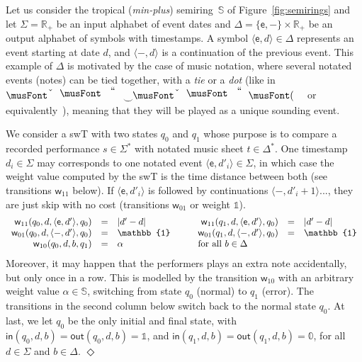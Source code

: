 \documentclass[runningheads]{llncs}
\def\endex{\hspace*{\fill} $\Diamond$\smallskip }
{\theorembodyfont{\rmfamily} \theoremstyle{break} \newtheorem{algo}{Algorithm}}
\def\<#1>{\langle #1 \rangle}
\newcommand{\R}{\mathcal{R}}
\newcommand{\Semiring}{\mathbb{S}}
\newcommand{\zero}{\mathbb{0}}
\newcommand{\one}{\mathbb{1}}
\def\SWT{\textsf{swT}\xspace}
\def\wei{\mathsf{w}}
\def\init{\mathsf{in}}
\def\final{\mathsf{out}}
\begin{document}
\begin{example}
Let us consider the tropical (\emph{min-plus}) semiring~$\Semiring$ 
of Figure~\ref{fig:semirings} and 
let $\Sigma = \mathbb{R}_+$ be an input alphabet of event dates
and $\Delta = \{ \mathsf{e}, \mathsf{-} \} \times \mathbb{R}_+$ 
be an output alphabet of symbols with timestamps. 
A symbol $\< \mathsf{e}, d > \in \Delta$ represents an event starting at date $d$, 
and $\< \mathsf{-}, d >$ is a continuation of the previous event.
This example of $\Delta$ is motivated by the case of music notation, 
where several notated events (notes) can be tied together, 
with a \emph{tie} or a \emph{dot}
(like in $\musQuarter\!\!\mathrel{\raisebox{-1.5mm}{$\smile$}}\!\!\musEighth$ 
 or equivalently~\musQuarterDotted),
meaning that they will be played as a unique sounding event.

We consider a \SWT with two states $q_0$ and $q_1$ whose purpose 
is to compare a recorded performance $s \in \Sigma^*$
with notated music sheet $t \in \Delta^*$.
One timestamp $d_i \in \Sigma$ may corresponds 
to one notated event $\<\mathsf{e}, d'_i> \in \Sigma$, in which case 
the weight value computed by the \SWT is the time distance between both
(see transitions $\wei_{11}$ below).
%
If $\<\mathsf{e}, d'_i>$ is followed by continuations 
$\<\mathsf{-}, d'_{i+1}>$..., they are just skip with no cost (transitions $\wei_{01}$ or weight $\one$).
\[
\begin{array}{rclcrcl}
\wei_{11}(q_0, d, \< \mathsf{e}, d'>, q_0) & = & |d' - d| & \quad &
\wei_{11}(q_1, d, \< \mathsf{e}, d'>, q_0) & = & |d' - d|\\
\wei_{01}(q_0, d, \< \mathsf{-}, d'>, q_0) & = & \one & &
\wei_{01}(q_1, d, \< \mathsf{-}, d'>, q_0) & = & \one\\
\wei_{10}(q_0, d, b, q_1) & = & \alpha & & \multicolumn{3}{l}{\mathrm{for~all~} b \in \Delta}
\end{array}
\]
%
Moreover, it may happen that the performers plays an extra note accidentally, but only once in a row. 
This is modelled by the transition $\wei_{10}$ with an arbitrary weight value $\alpha \in \Semiring$, 
switching from state $q_0$ (normal) to $q_1$ (error).
The transitions in the second column below switch back to the normal state $q_0$.
At last, we let $q_0$ be the only initial and final state, with
$\init(q_0, d, b) = \final(q_0, d, b) = \one$, and 
$\init(q_1, d, b) = \final(q_1, d, b) = \zero$, 
for all $d \in \Sigma$ and $b \in \Delta$.
\endex
\end{example}
\end{document}
